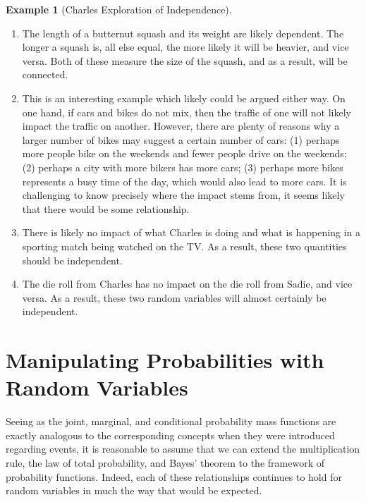 \documentclass[
  letterpaper,
  DIV=11,
  numbers=noendperiod]{scrreprt}
\theoremstyle{definition}
\theoremstyle{definition}
\theoremstyle{definition}
\newtheorem{example}{Example}[chapter]
\theoremstyle{remark}
\begin{document}
\begin{example}[Charles Exploration of
Independence]
\begin{tcolorbox}[enhanced jigsaw, colback=white, breakable, rightrule=.15mm, leftrule=.75mm, toprule=.15mm, left=2mm, arc=.35mm, opacityback=0, bottomrule=.15mm]
\begin{enumerate}
\def\labelenumi{\alph{enumi}.}
\item
  The length of a butternut squash and its weight are likely dependent.
  The longer a squash is, all else equal, the more likely it will be
  heavier, and vice versa. Both of these measure the size of the squash,
  and as a result, will be connected.
\item
  This is an interesting example which likely could be argued either
  way. On one hand, if cars and bikes do not mix, then the traffic of
  one will not likely impact the traffic on another. However, there are
  plenty of reasons why a larger number of bikes may suggest a certain
  number of cars: (1) perhaps more people bike on the weekends and fewer
  people drive on the weekends; (2) perhaps a city with more bikers has
  more cars; (3) perhaps more bikes represents a busy time of the day,
  which would also lead to more cars. It is challenging to know
  precisely where the impact stems from, it seems likely that there
  would be some relationship.
\item
  There is likely no impact of what Charles is doing and what is
  happening in a sporting match being watched on the TV. As a result,
  these two quantities should be independent.
\item
  The die roll from Charles has no impact on the die roll from Sadie,
  and vice versa. As a result, these two random variables will almost
  certainly be independent.
\end{enumerate}

\end{tcolorbox}

\end{example}

\section{Manipulating Probabilities with Random
Variables}\label{manipulating-probabilities-with-random-variables}

Seeing as the joint, marginal, and conditional probability mass
functions are exactly analogous to the corresponding concepts when they
were introduced regarding events, it is reasonable to assume that we can
extend the multiplication rule, the law of total probability, and Bayes'
theorem to the framework of probability functions. Indeed, each of these
relationships continues to hold for random variables in much the way
that would be expected.
\end{document}
